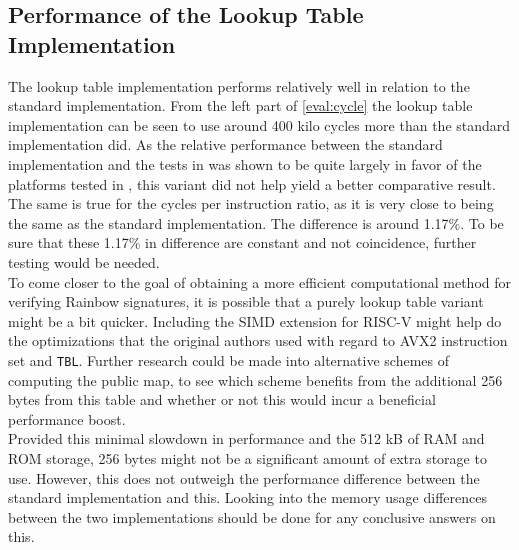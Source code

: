 \subsection{Performance of the Lookup Table Implementation}
The lookup table implementation performs relatively well in relation to the standard implementation. From the left part of \cref{eval:cycle} the lookup table implementation can be seen to use around 400 kilo cycles more than the standard implementation did. As the relative performance between the standard implementation and the tests in \cite{rainbownist} was shown to be quite largely in favor of the platforms tested in \cite{rainbownist}, this variant did not help yield a better comparative result.
\medskip\\
The same is true for the cycles per instruction ratio, as it is very close to being the same as the standard implementation. The difference is around 1.17\%. To be sure that these 1.17\% in difference are constant and not coincidence, further testing would be needed.
\medskip\\
To come closer to the goal of obtaining a more efficient computational method for verifying Rainbow signatures, it is possible that a purely lookup table variant might be a bit quicker. Including the SIMD extension for RISC-V might help do the optimizations that the original authors used with regard to AVX2 instruction set and \texttt{TBL}. Further research could be made into alternative schemes of computing the public map, to see which scheme benefits from the additional 256 bytes from this table and whether or not this would incur a beneficial performance boost.
\medskip\\
Provided this minimal slowdown in performance and the 512 kB of RAM and ROM storage, 256 bytes might not be a significant amount of extra storage to use. However, this does not outweigh the performance difference between the standard implementation and this. Looking into the memory usage differences between the two implementations should be done for any conclusive answers on this.
